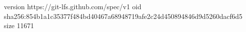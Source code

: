 version https://git-lfs.github.com/spec/v1
oid sha256:854b1a1c35377f484bd40467a68948719afe2c24d450894846d9d5260dacf6d5
size 11671
